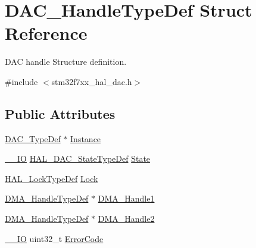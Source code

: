 \hypertarget{struct_d_a_c___handle_type_def}{}\section{D\+A\+C\+\_\+\+Handle\+Type\+Def Struct Reference}
\label{struct_d_a_c___handle_type_def}


D\+AC handle Structure definition.  




{\ttfamily \#include $<$stm32f7xx\+\_\+hal\+\_\+dac.\+h$>$}

\subsection*{Public Attributes}
\begin{DoxyCompactItemize}
\item 
\mbox{\hyperlink{struct_d_a_c___type_def}{D\+A\+C\+\_\+\+Type\+Def}} $\ast$ \mbox{\hyperlink{struct_d_a_c___handle_type_def_ac25a3f9270f3e98c4104361209ed1a49}{Instance}}
\item 
\mbox{\hyperlink{core__sc300_8h_aec43007d9998a0a0e01faede4133d6be}{\+\_\+\+\_\+\+IO}} \mbox{\hyperlink{group___d_a_c___exported___types_ga4e917340aba1cc3afd4e9a7fef15e4a5}{H\+A\+L\+\_\+\+D\+A\+C\+\_\+\+State\+Type\+Def}} \mbox{\hyperlink{struct_d_a_c___handle_type_def_a3e25489ceea69107572037728e9ac5f3}{State}}
\item 
\mbox{\hyperlink{stm32f7xx__hal__def_8h_ab367482e943333a1299294eadaad284b}{H\+A\+L\+\_\+\+Lock\+Type\+Def}} \mbox{\hyperlink{struct_d_a_c___handle_type_def_a6a7c2021d574c0e6a0aba35be03cf572}{Lock}}
\item 
\mbox{\hyperlink{group___d_m_a___exported___types_ga41b754a906b86bce54dc79938970138b}{D\+M\+A\+\_\+\+Handle\+Type\+Def}} $\ast$ \mbox{\hyperlink{struct_d_a_c___handle_type_def_afaf7fe475f68a08ab6d832c871c5dc10}{D\+M\+A\+\_\+\+Handle1}}
\item 
\mbox{\hyperlink{group___d_m_a___exported___types_ga41b754a906b86bce54dc79938970138b}{D\+M\+A\+\_\+\+Handle\+Type\+Def}} $\ast$ \mbox{\hyperlink{struct_d_a_c___handle_type_def_a67d937ab82140720a9aa7c57c5d1ef5a}{D\+M\+A\+\_\+\+Handle2}}
\item 
\mbox{\hyperlink{core__sc300_8h_aec43007d9998a0a0e01faede4133d6be}{\+\_\+\+\_\+\+IO}} uint32\+\_\+t \mbox{\hyperlink{struct_d_a_c___handle_type_def_ae0b1350155ba53babd8797c4e0c8bd0b}{Error\+Code}}
\end{DoxyCompactItemize}


